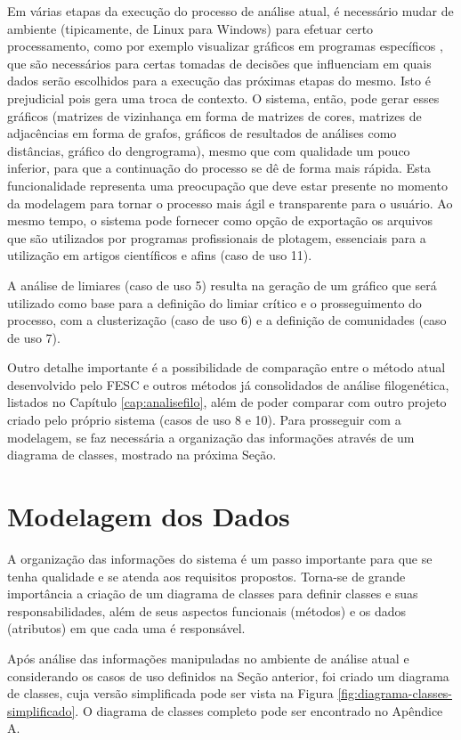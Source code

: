 Em várias etapas da execução do processo de análise atual, é necessário mudar de ambiente (tipicamente, de Linux para Windows) para efetuar certo processamento,
como por exemplo visualizar
gráficos em
programas específicos \cite{origin},
que são necessários para certas tomadas de decisões que influenciam em quais dados serão escolhidos para a execução das próximas etapas do mesmo. Isto é
prejudicial pois gera uma troca de contexto. O sistema, então, pode gerar esses gráficos (matrizes de vizinhança em forma de matrizes de cores, matrizes de
adjacências em forma de grafos, gráficos de resultados de análises como distâncias, gráfico do dengrograma), mesmo que com qualidade um pouco inferior,
para que a continuação do processo se dê de forma mais rápida. Esta funcionalidade representa
uma preocupação que deve estar presente no momento da modelagem para
tornar o processo mais ágil e transparente para o usuário. Ao mesmo tempo, o sistema pode fornecer como opção de exportação os arquivos que são utilizados por
programas profissionais de plotagem, essenciais para a utilização em artigos científicos e afins (caso de uso 11).

A análise de limiares (caso de uso 5) resulta na geração de um gráfico que será utilizado como base para a definição do limiar crítico e o prosseguimento
do processo, com a clusterização (caso de uso 6) e a definição de comunidades (caso de uso 7).

Outro detalhe importante é a possibilidade de comparação entre o método atual desenvolvido pelo FESC
e outros métodos já consolidados de análise filogenética, listados no Capítulo \ref{cap:analisefilo},
além de poder comparar com outro projeto criado pelo próprio sistema (casos de uso 8 e 10).
Para prosseguir com a modelagem, se faz necessária a organização das informações através
de um diagrama de classes, mostrado na próxima Seção.

\section{Modelagem dos Dados} \label{sec:organizacao}

A organização das informações do sistema é um passo importante para que se tenha qualidade e se atenda aos requisitos propostos. Torna-se de grande
importância
a criação de um diagrama de classes para definir classes e suas responsabilidades, além de seus aspectos funcionais (métodos)
e os dados
(atributos) em que cada uma é responsável.

Após análise das informações manipuladas no ambiente de análise atual e considerando os casos de uso definidos na Seção anterior,
foi criado um diagrama de classes, cuja versão simplificada pode ser vista na Figura
\ref{fig:diagrama-classes-simplificado}. O diagrama de classes completo pode ser encontrado no Apêndice A.


